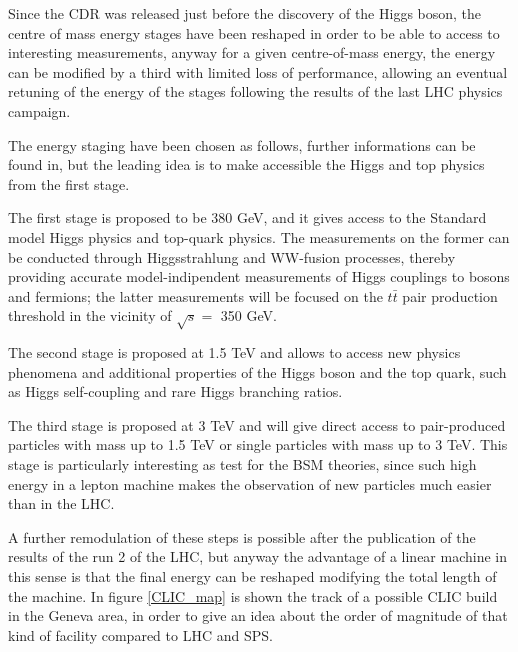 Since the CDR\cite{CLIC:cdr} was released just before the discovery of the Higgs boson, the centre of mass energy stages have been reshaped in order to be able to access to interesting measurements, anyway for a given centre-of-mass energy, the energy can be modified by a third with limited loss of performance\cite{CLIC:cdrVol3}, allowing an eventual retuning of the energy of the stages following the results of the last LHC physics campaign.

The energy staging have been chosen as follows, further informations can be found in\cite{CLIC:staging2016,Bozovic-Jelisavcic:2160172}, but the leading idea is to make accessible the Higgs and top physics from the first stage.

The first stage is proposed to be 380 GeV, and it gives access to the Standard model Higgs physics and top-quark physics. The measurements on the former can be conducted through Higgsstrahlung and WW-fusion processes, thereby providing accurate model-indipendent measurements of Higgs couplings to bosons and fermions\cite{Roloff:2210491}; the latter measurements will be focused on the $t\bar{t}$ pair production threshold in the vicinity of $\sqrt{s} = $ 350 GeV.

The second stage is proposed at 1.5 TeV and allows to access new physics phenomena and additional properties of the Higgs boson and the top quark, such as Higgs self-coupling and rare Higgs branching ratios.

The third stage is proposed at 3 TeV and will give direct access to pair-produced particles with mass up to 1.5 TeV or single particles with mass up to 3 TeV. This stage is particularly interesting as test for the BSM theories, since such high energy in a lepton machine makes the observation of new particles much easier than in the LHC.

A further remodulation of these steps is possible after the publication of the results of the run 2 of the LHC, but anyway the advantage of a linear machine in this sense is that the final energy can be reshaped modifying the total length of the machine. In figure \ref{CLIC_map} is shown the track of a possible CLIC build in the Geneva area, in order to give an idea about the order of magnitude of that kind of facility compared to LHC and SPS.

